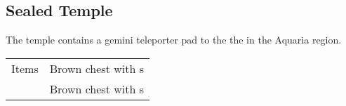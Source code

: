 \subsection{Sealed Temple}
\label{map:sealed_temple}

The temple contains a gemini teleporter pad to the the  in the Aquaria region.

\noindent\begin{tabularx}{\textwidth}[l]{lX}
	Items
	& Brown chest with \nameref{item:cure_potion}s \\
	& Brown chest with \nameref{item:heal_potion}s
\end{tabularx}
